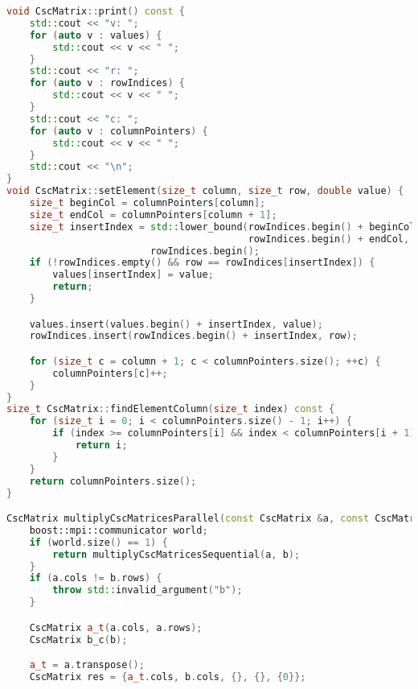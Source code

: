 \documentclass[a4paper,12pt]{article}
\begin{document}
\begin{lstlisting}[language=C++]
void CscMatrix::print() const {
    std::cout << "v: ";
    for (auto v : values) {
        std::cout << v << " ";
    }
    std::cout << "r: ";
    for (auto v : rowIndices) {
        std::cout << v << " ";
    }
    std::cout << "c: ";
    for (auto v : columnPointers) {
        std::cout << v << " ";
    }
    std::cout << "\n";
}
void CscMatrix::setElement(size_t column, size_t row, double value) {
    size_t beginCol = columnPointers[column];
    size_t endCol = columnPointers[column + 1];
    size_t insertIndex = std::lower_bound(rowIndices.begin() + beginCol,
                                          rowIndices.begin() + endCol, row) -
                         rowIndices.begin();
    if (!rowIndices.empty() && row == rowIndices[insertIndex]) {
        values[insertIndex] = value;
        return;
    }

    values.insert(values.begin() + insertIndex, value);
    rowIndices.insert(rowIndices.begin() + insertIndex, row);

    for (size_t c = column + 1; c < columnPointers.size(); ++c) {
        columnPointers[c]++;
    }
}
size_t CscMatrix::findElementColumn(size_t index) const {
    for (size_t i = 0; i < columnPointers.size() - 1; i++) {
        if (index >= columnPointers[i] && index < columnPointers[i + 1]) {
            return i;
        }
    }
    return columnPointers.size();
}

CscMatrix multiplyCscMatricesParallel(const CscMatrix &a, const CscMatrix &b) {
    boost::mpi::communicator world;
    if (world.size() == 1) {
        return multiplyCscMatricesSequential(a, b);
    }
    if (a.cols != b.rows) {
        throw std::invalid_argument("b");
    }

    CscMatrix a_t(a.cols, a.rows);
    CscMatrix b_c(b);

    a_t = a.transpose();
    CscMatrix res = {a_t.cols, b.cols, {}, {}, {0}};


\end{lstlisting}
\end{document}
